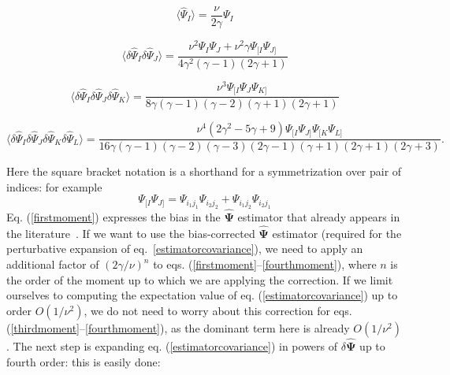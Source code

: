 \documentclass[reprint,aps,prd,superscriptaddress,showkeys,showpacs]{revtex4-1}
\newcommand{\bbh}[1]{\mathbf{\hat{#1}}}
\newcommand{\h}[1]{\hat{#1}}
\begin{document}
\begin{widetext}

\begin{equation}
\label{firstmoment}
\langle\h{\Psi}_I\rangle = \frac{\nu}{2\gamma}\Psi_I
\end{equation}

\begin{equation}
\label{secondmoment}
\langle\delta\h{\Psi}_I\delta\h{\Psi}_J\rangle = \frac{\nu^2\Psi_I\Psi_J + \nu^2\gamma\Psi_{[I}\Psi_{J]}}{4\gamma^2(\gamma-1)(2\gamma+1)}
\end{equation}

\begin{equation}
\label{thirdmoment}
\langle\delta\h{\Psi}_I\delta\h{\Psi}_J\delta\h{\Psi}_K\rangle = \frac{\nu^3\Psi_{[I}\Psi_J\Psi_{K]}}{8\gamma(\gamma-1)(\gamma-2)(\gamma+1)(2\gamma+1)}
\end{equation}

\begin{equation}
\label{fourthmoment}
\langle\delta\h{\Psi}_I\delta\h{\Psi}_J\delta\h{\Psi}_K\delta\h{\Psi}_L\rangle = \frac{\nu^4(2\gamma^2-5\gamma+9)\Psi_{[I}\Psi_{J]}\Psi_{[K}\Psi_{L]}}{16\gamma(\gamma-1)(\gamma-2)(\gamma-3)(2\gamma-1)(\gamma+1)(2\gamma+1)(2\gamma+3)}.
\end{equation}

\end{widetext}
%
Here the square bracket notation is a shorthand for a symmetrization over pair of indices: for example
\begin{equation}
\Psi_{[I}\Psi_{J]} = \Psi_{i_1j_1}\Psi_{i_2j_2} + \Psi_{i_1j_2}\Psi_{i_2j_1}
\end{equation}
%
Eq. (\ref{firstmoment}) expresses the bias in the $\bbh{\Psi}$
estimator that already appears in the literature~\citep{Hartlap07}. If
we want to use the bias-corrected $\bbh{\Psi}$ estimator (required for
the perturbative expansion of eq.~\ref{estimatorcovariance}), we need
to apply an additional factor of $(2\gamma/\nu)^n$ to
eqs. (\ref{firstmoment}--\ref{fourthmoment}), where $n$ is the order
of the moment up to which we are applying the correction. If we limit
ourselves to computing the expectation value of
eq. (\ref{estimatorcovariance}) up to order $O(1/\nu^2)$, we do not
need to worry about this correction for
eqs. (\ref{thirdmoment}--\ref{fourthmoment}), as the dominant term
here is already $O(1/\nu^2)$. The next step is expanding
eq. (\ref{estimatorcovariance}) in powers of $\delta\bbh{\Psi}$ up to
fourth order: this is easily done:
\end{document}

